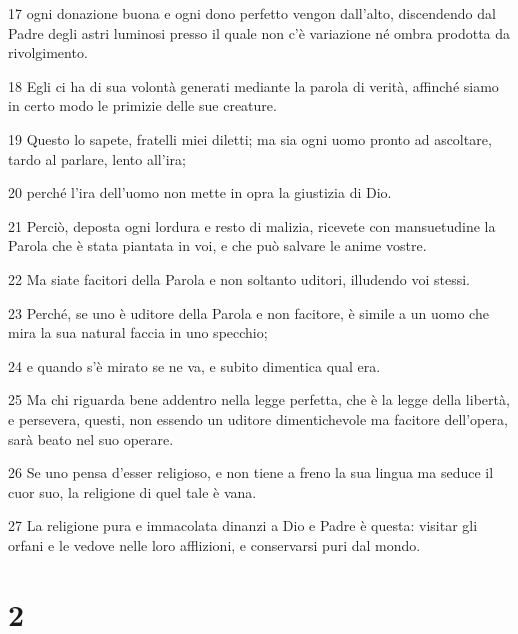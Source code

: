\par 17 ogni donazione buona e ogni dono perfetto vengon dall'alto, discendendo dal Padre degli astri luminosi presso il quale non c'è variazione né ombra prodotta da rivolgimento.
\par 18 Egli ci ha di sua volontà generati mediante la parola di verità, affinché siamo in certo modo le primizie delle sue creature.
\par 19 Questo lo sapete, fratelli miei diletti; ma sia ogni uomo pronto ad ascoltare, tardo al parlare, lento all'ira;
\par 20 perché l'ira dell'uomo non mette in opra la giustizia di Dio.
\par 21 Perciò, deposta ogni lordura e resto di malizia, ricevete con mansuetudine la Parola che è stata piantata in voi, e che può salvare le anime vostre.
\par 22 Ma siate facitori della Parola e non soltanto uditori, illudendo voi stessi.
\par 23 Perché, se uno è uditore della Parola e non facitore, è simile a un uomo che mira la sua natural faccia in uno specchio;
\par 24 e quando s'è mirato se ne va, e subito dimentica qual era.
\par 25 Ma chi riguarda bene addentro nella legge perfetta, che è la legge della libertà, e persevera, questi, non essendo un uditore dimentichevole ma facitore dell'opera, sarà beato nel suo operare.
\par 26 Se uno pensa d'esser religioso, e non tiene a freno la sua lingua ma seduce il cuor suo, la religione di quel tale è vana.
\par 27 La religione pura e immacolata dinanzi a Dio e Padre è questa: visitar gli orfani e le vedove nelle loro afflizioni, e conservarsi puri dal mondo.

\chapter{2}

